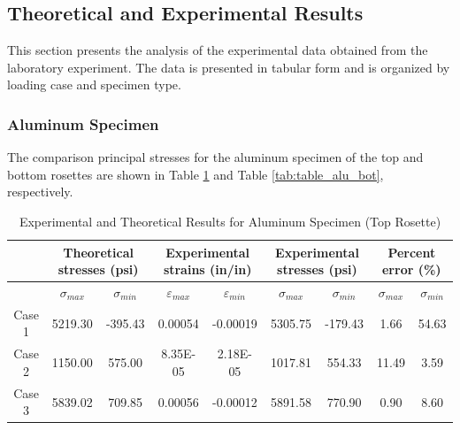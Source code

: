 \documentclass[12pt, titlepage]{article}
\begin{document}
\subsection{Theoretical and Experimental Results}
This section presents the analysis of the experimental data obtained from the
laboratory experiment. The data is presented in tabular form and is organized
by loading case and specimen type.
\subsubsection{Aluminum Specimen}
The comparison principal stresses for the aluminum specimen of the top and
bottom rosettes are shown in Table \ref{tab:table_alu_top} and Table
\ref{tab:table_alu_bot}, respectively.
\begin{table}[H]
  \begin{adjustwidth}{-1in}{-1in}
    \begin{tabular}{|c|c|c|c|c|c|c|c|c|} \hline
        & \multicolumn{2}{|c|}{\parbox{4cm}{\centering\textbf{Theoretical stresses (psi)}}} 
        & \multicolumn{2}{|c|}{\parbox{4cm}{\centering\textbf{Experimental strains (in/in)}}} 
        & \multicolumn{2}{|c|}{\parbox{4cm}{\centering\textbf{Experimental stresses (psi)}}} 
        & \multicolumn{2}{|c|}{\parbox{4cm}{\centering\textbf{Percent error (\%)}}} 
        \\ \hline
        & $\sigma_{max}$ & $\sigma_{min}$ & $\varepsilon_{max}$ & $\varepsilon_{min}$ & $\sigma_{max}$ & $\sigma_{min}$ & $\sigma_{max}$ & $\sigma_{min}$ \\ \hline
        Case 1 & 5219.30 & -395.43 & 0.00054 & -0.00019 & 5305.75 & -179.43 & 1.66 & 54.63 \\ \hline
        Case 2 & 1150.00 & 575.00 & 8.35E-05 & 2.18E-05 & 1017.81 & 554.33 & 11.49 & 3.59 \\ \hline
        Case 3 & 5839.02 & 709.85 & 0.00056 & -0.00012 & 5891.58 & 770.90 & 0.90 & 8.60 \\ \hline
    \end{tabular}
  \end{adjustwidth}
  \captionsetup{justification=raggedright,singlelinecheck=false}
  \caption{Experimental and Theoretical Results for Aluminum Specimen (Top Rosette)}
  \label{tab:table_alu_top}
\end{table}
\end{document}
